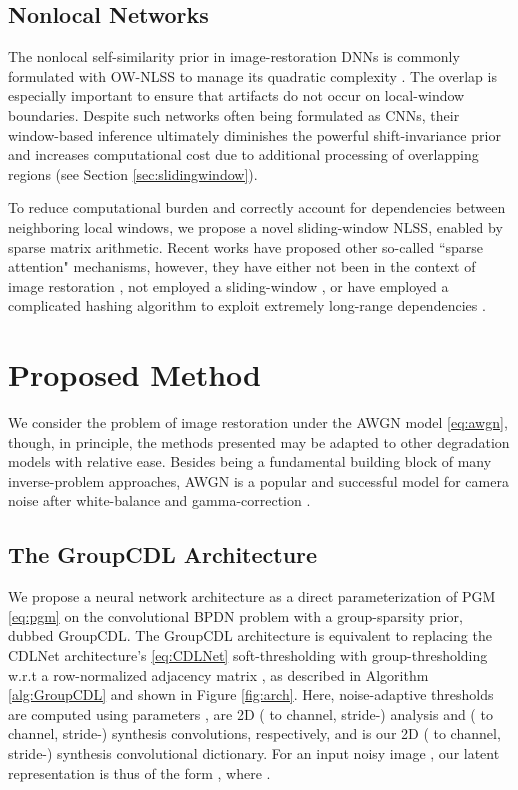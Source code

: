 \documentclass[lettersize,journal]{IEEEtran}
\begin{document}
\subsection{Nonlocal Networks}
The nonlocal self-similarity prior in image-restoration DNNs is commonly
formulated with OW-NLSS to manage its quadratic complexity \cite{liu2018non,
lecouat2020nonlocal}. The overlap is especially important to ensure that
artifacts do not occur on local-window boundaries. Despite such networks often
being formulated as CNNs, their window-based inference ultimately diminishes the
powerful shift-invariance prior and increases computational cost due to
additional processing of overlapping regions (see Section
\ref{sec:slidingwindow}). 

To reduce computational burden and correctly account for dependencies between
neighboring local windows, we propose a novel sliding-window NLSS, enabled by
sparse matrix arithmetic. Recent works have proposed other so-called ``sparse
attention" mechanisms, however, they have either not been in the context of
image restoration \cite{child2019sparsetransformer}, not employed a
sliding-window \cite{dao2022flashattention}, or have employed a complicated
hashing algorithm to exploit extremely long-range dependencies
\cite{Mei_2021_CVPR}. 

\section{Proposed Method} \label{sec:method}
We consider the problem of image restoration under the AWGN model
\eqref{eq:awgn}, though, in principle, the methods presented may be adapted to
other degradation models with relative ease. Besides being a fundamental building
block of many inverse-problem approaches, AWGN is a popular and successful model
for camera noise after white-balance and gamma-correction \cite{Khashabi2014}. 

\subsection{The GroupCDL Architecture}
We propose a neural network architecture as a direct parameterization of
PGM \eqref{eq:pgm} on the convolutional BPDN problem with a group-sparsity prior, dubbed GroupCDL. 
The GroupCDL architecture is equivalent to replacing the CDLNet
\cite{janjusevicCDLNet2022} architecture's \eqref{eq:CDLNet}
soft-thresholding with group-thresholding w.r.t a row-normalized
adjacency matrix , as described in Algorithm \ref{alg:GroupCDL} and shown in Figure \ref{fig:arch}.
Here, noise-adaptive thresholds are computed using parameters ,
 are 2D ( to  channel, stride-) analysis and ( to 
channel, stride-) synthesis convolutions,
respectively, and  is our 2D ( to  channel, stride-) synthesis
convolutional dictionary. For an input noisy image , our latent
representation is thus of the form , where {}.
\end{document}
